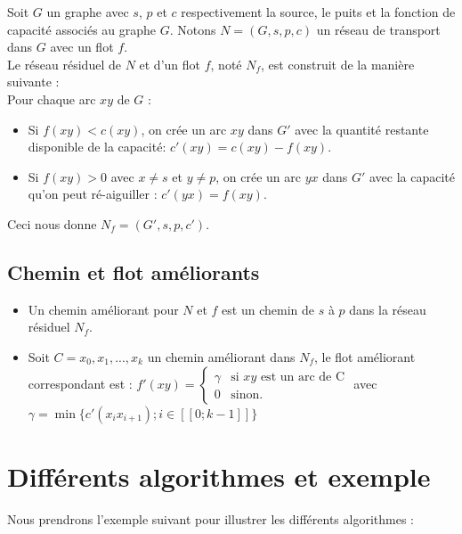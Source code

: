 \documentclass[a4paper]{article}
\begin{document}
Soit $G$ un graphe avec $s$, $p$ et $c$ respectivement la source, le puits et la fonction de capacité associés au graphe $G$. Notons $N = (G,s,p,c)$ un réseau de transport dans $G$ avec un flot $f$.\\
Le réseau résiduel de $N$ et d'un flot $f$, noté $N_f$, est construit de la manière suivante :\\
Pour chaque arc $xy$ de $G$ :
\begin{itemize}
	\item
    Si $f(xy)<c(xy)$, on crée un arc $xy$ dans $G'$ avec la quantité restante disponible de la capacité: $c'(xy) = c(xy) - f(xy)$.
    \item 
    Si $f(xy)>0$ avec $x\ne s$ et $y\ne p$, on crée un arc $yx$ dans $G'$ avec la capacité qu'on peut ré-aiguiller : $c'(yx) = f(xy)$.
\end{itemize}
Ceci nous donne $N_f = (G',s,p,c')$.\\
\subsection{Chemin et flot améliorants}
\begin{itemize}
	\item
    Un chemin améliorant pour $N$ et $f$ est un chemin de $s$ à $p$ dans la réseau résiduel $N_f$.
    \item
    Soit $C = x_0,x_1,...,x_k$ un chemin améliorant dans $N_f$, le flot améliorant correspondant est :
$f'(xy) = \left\{
    \begin{array}{ll}
        \gamma & \mbox{si } xy \mbox{ est un arc de C} \\
        0 & \mbox{sinon.}
    \end{array}
\right.$
avec $\gamma = \min \{c'(x_ix_{i+1}); i \in [\![0;k-1]\!]\}$\\
\end{itemize}
\section{Différents algorithmes et exemple}
Nous prendrons l'exemple suivant pour illustrer les différents algorithmes :
\end{document}
